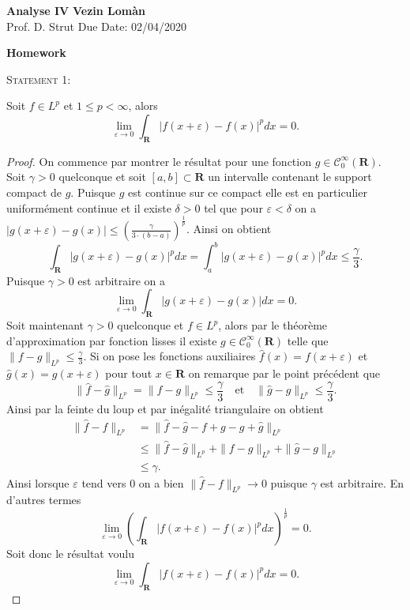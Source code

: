 \documentclass[12pt]{article}
\newenvironment{statement}[1]
{\begin{mdframed}[linewidth=0.6pt]
        \textsc{Statement #1:}

}
    {\end{mdframed}}
\begin{document}
	\noindent
\textbf{Analyse IV} \hfill \textbf{Vezin Lomàn}\\
\normalsize Prof. D. Strut \hfill Due Date: 02/04/2020\\

\begin{center}
\textbf{Homework}
\end{center}
	\begin{statement}{1}
		Soit $f \in L^p$ et $1 \le p < \infty$, alors \[
			\lim_{\varepsilon \rightarrow 0} \int_{\mathbf{R}}|f(x+\varepsilon) - f(x)|^p dx = 0
		.\] 	
	\end{statement}
	\begin{proof}
		On commence par montrer le résultat pour une fonction $g \in \mathcal{C}_{0}^{\infty}(\mathbf{R})$. \\
		Soit $\gamma > 0$ quelconque et soit $[a,b] \subset \mathbf{R}$ un intervalle contenant le support compact de $g$. Puisque $g$ est continue sur ce compact elle est en particulier uniformément continue et il existe $\delta > 0$ tel que pour $\varepsilon < \delta$ on a $|g(x+\varepsilon)-g(x)| \le {(\frac{\gamma}{3\cdot(b-a)})}^{\frac{1}{p}}$. Ainsi on obtient \[
			\int_{\mathbf{R}}|g(x+\varepsilon)-g(x)|^pdx = \int_a^b|g(x+\varepsilon)-g(x)|^pdx \le \frac{\gamma}{3}
		.\] 
		Puisque $\gamma > 0$ est arbitraire on a \[
			\lim_{\varepsilon \rightarrow 0} \int_{\mathbf{R}}|g(x+\varepsilon)-g(x)|dx = 0
		.\] 
		Soit maintenant $\gamma > 0$ quelconque et $f \in L^{p}$, alors par le théorème d'approximation par fonction lisses il existe $g \in \mathcal{C}_{0}^{\infty}(\mathbf{R})$ telle que $\|f-g\|_{L^{p}} \le \frac{\gamma}{3}$.
		Si on pose les fonctions auxiliaires $\hat{f}(x) = f(x+\varepsilon)$ et $\hat{g}(x) = g(x+\varepsilon)$ pour tout $x \in \mathbf{R}$ on remarque par le point précédent que \[
			\|\hat{f}- \hat{g}\|_{L^{p}} = \|f-g\|_{L^{p}} \le \frac{\gamma}{3} \quad \text{et} \quad \|\hat{g} - g\|_{L^{p}} \le \frac{\gamma}{3}
		.\] 
		Ainsi par la feinte du loup et par inégalité triangulaire on obtient 
		\begin{align*}
			\|\hat{f}-f\|_{L^{p}} &= \|\hat{f}-\hat{g}-f+g-g+\hat{g}\|_{L^{p}} \\
					      &\le \|\hat{f}-\hat{g}\|_{L^{p}} + \|f-g\|_{L^{p}} + \|\hat{g}-g\|_{L^{p}} \\
					      &\le \gamma
		.\end{align*}
		Ainsi lorsque $\varepsilon$ tend vers 0 on a bien $\|\hat{f}-f\|_{L^{p}} \longrightarrow 0$ puisque $\gamma$ est arbitraire. En d'autres termes  \[
		\lim_{\varepsilon \rightarrow 0} (\int_{\mathbf{R}}{|f(x+\varepsilon)-f(x)|^pdx})^{\frac{1}{p}} = 0
		.\] 
		Soit donc le résultat voulu \[
		\lim_{\varepsilon \rightarrow 0} \int_{\mathbf{R}}|f(x+\varepsilon)-f(x)|^pdx = 0
		.\] 
	\end{proof}
\end{document}
